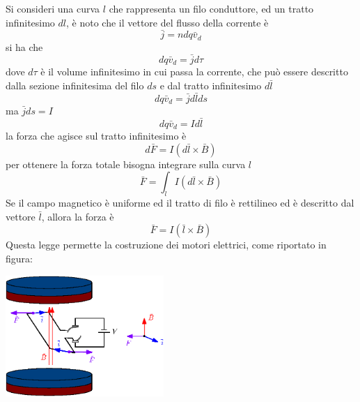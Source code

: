 \documentclass[10pt, letterpaper]{report}
\begin{document}
Si consideri una curva $l$ che rappresenta un filo conduttore, ed un tratto infinitesimo $d l$, è noto che il vettore del flusso della corrente è 
$$ \bar j = ndq\bar v_d$$
si ha che 
$$ dq\bar v_d=\bar jd\tau$$
dove $d\tau$ è il volume infinitesimo in cui passa la corrente, che può essere descritto dalla sezione infinitesima del filo $ds$ e dal tratto infinitesimo $d\bar l$ 
$$dq\bar v_d=\bar j d\bar lds $$
ma $\bar j ds =I$
$$ dq\bar v_d=Id\bar l$$
la forza che agisce sul tratto infinitesimo è 
$$ d\bar F =I(d\bar l\times \bar B)$$
per ottenere la forza totale bisogna integrare sulla curva $l$
$$ \bar F = \int_lI(d\bar l\times \bar B )$$
Se il campo magnetico è uniforme ed il tratto di filo è rettilineo ed è descritto dal vettore $\bar l$, allora la forza è 
$$ \bar F = I(\bar l\times \bar B)$$
Questa legge permette la costruzione dei motori elettrici, come riportato in figura:
\begin{center}
    \includegraphics[width=0.45\textwidth ]{images/motore2.eps}
\end{center}
\end{document}
